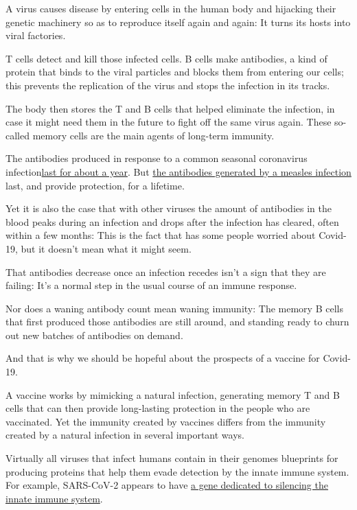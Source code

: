 A virus causes disease by entering cells in the human body and hijacking
their genetic machinery so as to reproduce itself again and again: It
turns its hosts into viral factories.

T cells detect and kill those infected cells. B cells make antibodies, a
kind of protein that binds to the viral particles and blocks them from
entering our cells; this prevents the replication of the virus and stops
the infection in its tracks.

The body then stores the T and B cells that helped eliminate the
infection, in case it might need them in the future to fight off the
same virus again. These so-called memory cells are the main agents of
long-term immunity.

The antibodies produced in response to a common seasonal coronavirus
infection\href{https://www.ncbi.nlm.nih.gov/pmc/articles/PMC2271881/pdf/epidinfect00023-0213.pdf}{last
for about a year}. But
\href{https://www.cdc.gov/Vaccines/pubs/surv-manual/chpt07-measles.pdf}{the
antibodies generated by a measles infection} last, and provide
protection, for a lifetime.

Yet it is also the case that with other viruses the amount of antibodies
in the blood peaks during an infection and drops after the infection has
cleared, often within a few months: This is the fact that has some
people worried about Covid-19, but it doesn't mean what it might seem.

That antibodies decrease once an infection recedes isn't a sign that
they are failing: It's a normal step in the usual course of an immune
response.

Nor does a waning antibody count mean waning immunity: The memory B
cells that first produced those antibodies are still around, and
standing ready to churn out new batches of antibodies on demand.

And that is why we should be hopeful about the prospects of a vaccine
for Covid-19.

A vaccine works by mimicking a natural infection, generating memory T
and B cells that can then provide long-lasting protection in the people
who are vaccinated. Yet the immunity created by vaccines differs from
the immunity created by a natural infection in several important ways.

Virtually all viruses that infect humans contain in their genomes
blueprints for producing proteins that help them evade detection by the
innate immune system. For example, SARS-CoV-2 appears to have
\href{https://www.biorxiv.org/content/10.1101/2020.05.11.088179v1}{a
gene dedicated to silencing the innate immune system}.

